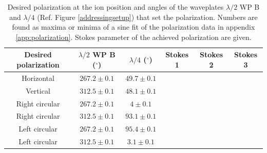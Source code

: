 \begin{table}
\centering
\begin{tabular}{c c c c c c}
 \toprule
    {Desired polarization} & {$\lambda/2$ WP B ($^\circ$)} & {$\lambda/4$ ($^\circ$)} & Stokes 1 & Stokes 2 & Stokes 3\\ \midrule\midrule
   Horizontal & $267.2\pm 0.1$ & $49.7\pm0.1$  \\
   Vertical   & $312.5\pm0.1$ & $48.1\pm0.1$\\ \midrule
   Right circular & $267.2\pm 0.1$ & $4\pm 0.1$ \\
   Right circular & $312.5\pm0.1$ & $93.1\pm0.1$\\\midrule
  Left circular & $267.2\pm 0.1$ & $95.4\pm0.1$\\
    Left circular & $312.5\pm0.1$  & $3.1\pm0.1$\\ \bottomrule
\end{tabular}
\caption{Desired polarization at the ion position and angles of the waveplates $\lambda/2$ WP B and $\lambda/4$ (Ref. Figure \ref{addressingsetup}) that set the polarization. Numbers are found as maxima or minima of a sine fit of the polarization data in appendix \ref{app:polarization}. Stokes parameter of the achieved polarization are given.}
\label{polarizationstable}
\end{table}

